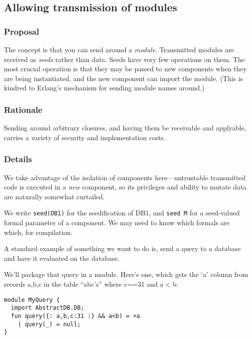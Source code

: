 \subsection{Allowing transmission of modules}\label{sec:transmit-modules}

\subsubsection*{Proposal}
The concept is that you can send around a \emph{module}. 
Transmitted modules are received as \emph{seeds} rather than data. Seeds have very
few operations on them. The most crucial operation is that they may be passed
to new components when they are being instantiated, and the new component can
import the module. (This is kindred to Erlang's mechanism for sending module
names around.)

\subsubsection*{Rationale}

Sending around arbitrary closures, and having them be receivable and
applyable, carries a variety of security and implementation costs.

\subsubsection*{Details}

We take advantage of the isolation of components here---untrustable
transmitted code is executed in a \emph{new} component, so its privileges and
ability to mutate data are naturally somewhat curtailed.  

We write \lstinline{seed(DB1)} for the seedification of DB1, and \lstinline{seed M} for a
seed-valued formal parameter of a component.  We may need to
know which formals are which, for compilation.

A standard example of something we want to do is, send a query to a database
and have it evaluated on the database. 

We'll package that query in a module.  Here's one, which gets the `a' column
from records a,b,c in the table ``abc's'' where c==31 and a$<$b: 

\begin{lstlisting}
module MyQuery {
  import AbstractDB.DB;   
  fun query({: a,b,c:31 :} && a<b) = +a
    | query(_) = null;
}
\end{lstlisting}

